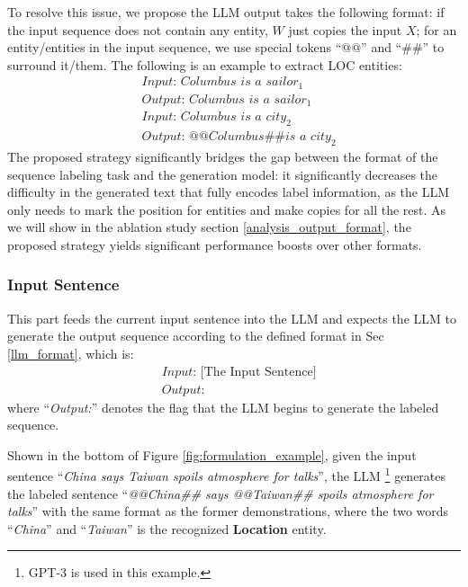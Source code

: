 \documentclass{article}
\begin{document}
To resolve this issue, we propose the LLM output takes the following format:
if the input sequence does not contain any entity, $W$ just copies the input $X$;
for an entity/entities in the input sequence, we use special tokens “@@” and “\#\#” to surround it/them.
The following is an example to extract LOC entities:
\begin{equation}
\nonumber
    \begin{aligned}
      	&\textit{Input: }\textit{Columbus is a sailor}_{1} \\
      	&\textit{Output: }\textit{Columbus is a sailor}_{1} \\
      	&\textit{Input: }\textit{Columbus is a city}_{2} \\
      	&\textit{Output: }\textit{@@Columbus\#\# is a city}_{2}
    \end{aligned}
\end{equation}
The proposed strategy significantly bridges the gap between the format of the sequence labeling task and the generation model:
it significantly decreases the difficulty in the generated text that fully encodes label information, as the LLM only needs to mark the position for 
entities and make copies for all the rest. As we will show in the ablation study section \ref{analysis_output_format}, the proposed strategy yields significant performance boosts
over other formats. 

\subsubsection{Input Sentence}

This part feeds the current input sentence into the LLM and expects the LLM to generate the output sequence according to the defined format in Sec \ref{llm_format}, which is:
\begin{equation}
\nonumber
    \begin{aligned}
      	&\textit{Input: }\text{[The Input Sentence]} \\
      	&\textit{Output: }
    \end{aligned}
\end{equation}
where “\textit{Output:}” denotes the flag that the LLM begins to generate the labeled sequence. 

Shown in the bottom of Figure \ref{fig:formulation_example}, given the input sentence “\textit{China says Taiwan spoils atmosphere for talks}”, the LLM \footnote{GPT-3 is used in this example.} generates the labeled sentence “\textit{@@China\#\# says @@Taiwan\#\# spoils atmosphere for talks}” with the same format as the former demonstrations, where the two words “\textit{China}” and “\textit{Taiwan}” is the recognized \textbf{Location} entity.
\end{document}

